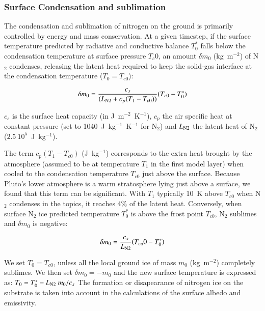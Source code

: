 \subsubsection{Surface Condensation and sublimation}

The condensation and sublimation of nitrogen on the ground
is primarily controlled by energy and mass conservation.
At a given timestep,  if the surface temperature predicted by radiative and
conductive balance $T_0^*$ falls below the 
condensation temperature at surface pressure $T_c0$, 
an amount 
$\delta m_0$ (kg~m$^{-2}$) of N$_2$ condenses, releasing
the latent heat required to keep the solid-gas interface at the condensation
temperature ($T_0 = T_{c0}$):

\begin{equation}
\label{eq:condatm}
\delta m_0 = \frac{c_s}{(L_{\mbox{\scriptsize N2}}  +c_p(T_1 -T_{c0}))} (T_{c0} - T^*_0) 
\end{equation}

$c_s$ is the surface heat capacity (in J~m$^{-2}$~K$^{-1}$), 
$c_p$  the air specific heat at constant pressure
(set to 1040~J~kg$^{-1}$~K$^{-1}$ for N$_2$) and $L_{\mbox{\scriptsize N2}} $ the latent
heat of N$_2$ ($2.5~10^5$~J~kg$^{-1}$). 

The term $c_p(T_1 -T_{c0})$ (J~kg$^{-1}$) corresponds to the extra heat brought by the
atmosphere (assumed to be at temperature $T_1$ in the first model layer) when cooled
to the condensation temperature $T_{c0}$ just above the surface.
Because Pluto's lower atmosphere is a warm stratosphere lying just above a
surface, 
we found that this term can be significant. With $T_1$ typically 10~K above 
$T_{c0}$ when N$_2$ condenses in the topics, it reaches 4\% of the latent heat. 
Conversely, when surface N$_2$ ice predicted temperature 
$T^*_0$ is above the frost point $T_{c0}$, N$_2$ sublimes
and $\delta m_0$ is negative:

\begin{equation}
\delta m_0 = \frac{c_s}{L_{\mbox{\scriptsize N2}} } (T_{ca}0 - T^*_0) 
\end{equation}

We set $T_0 = T_{c0}$, unless all the local ground ice of mass $m_0$ (kg~m$^{-2}$)
completely sublimes. We then set $\delta m_0 = -m_0$ and
the new surface temperature is expressed as:
$T_0 = T^*_0 - L_{\mbox{\scriptsize N2}}  \ m_0 / c_s $
The formation or disapearance of nitrogen ice on the substrate is taken into
account in the calculations of the surface albedo and emissivity.

